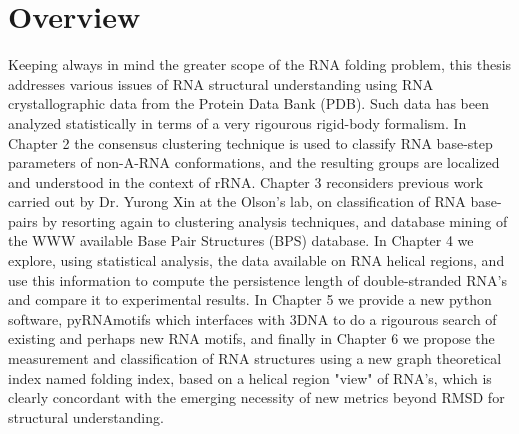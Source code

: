 \section{Overview}
Keeping always in  mind the greater scope of  the RNA folding problem,
this thesis  addresses various issues of  RNA structural understanding
using RNA crystallographic data from the Protein Data Bank (PDB). Such
data  has been  analyzed statistically  in terms  of a  very rigourous
rigid-body formalism.  In Chapter 2 the consensus clustering technique
is   used  to   classify   RNA  base-step   parameters  of   non-A-RNA
conformations, and  the resulting groups are  localized and understood
in the context  of rRNA.  Chapter 3 reconsiders  previous work carried
out by  Dr. Yurong Xin  at the Olson's  lab, on classification  of RNA
base-pairs by  resorting again to clustering  analysis techniques, and
database  mining  of the  WWW  available  Base  Pair Structures  (BPS)
database.  In  Chapter 4 we  explore, using statistical  analysis, the
data available  on RNA  helical regions, and  use this  information to
compute the persistence length of double-stranded RNA's and compare it
to  experimental  results.  In  Chapter  5 we  provide  a  new  python
software,  pyRNAmotifs which interfaces  with 3DNA  to do  a rigourous
search of existing and perhaps  new RNA motifs, and finally in Chapter
6  we propose  the measurement  and classification  of  RNA structures
using a  new graph theoretical index  named folding index,  based on a
helical region "view"  of RNA's, which is clearly  concordant with the
emerging  necessity   of  new  metrics  beyond   RMSD  for  structural
understanding.


